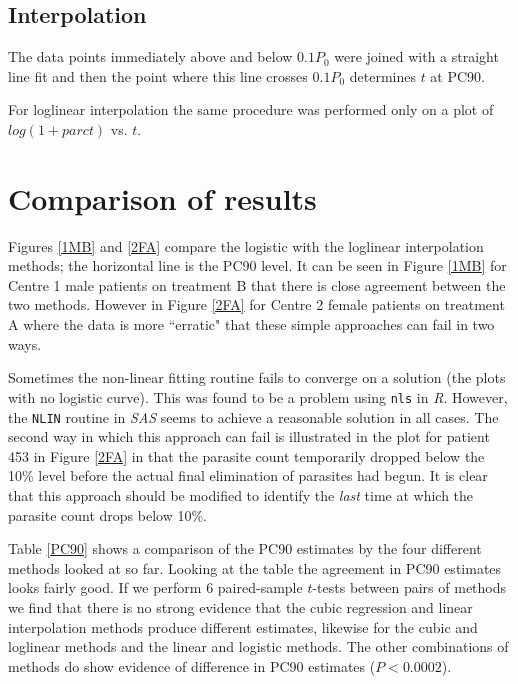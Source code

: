 \subsection{Interpolation}
The data points immediately above and below $0.1P_0$ were joined with a straight line fit and then the point where this line crosses $0.1P_0$ determines $t$ at PC90.

For loglinear interpolation the same procedure was performed only on a plot of $log(1+parct)$ vs. $t$.
\section{Comparison of results}
Figures \ref{1MB} and \ref{2FA} compare the logistic with the loglinear interpolation methods; the horizontal line is the PC90 level. It can be seen in Figure \ref{1MB} for Centre 1 male patients on treatment B that there is close agreement between the two methods. However in Figure \ref{2FA} for Centre 2 female patients on treatment A where the data is more ``erratic" that these simple approaches can fail in two ways.

Sometimes the non-linear fitting routine fails to converge on a solution (the plots with no logistic curve). This was found to be a problem using \texttt{nls} in \emph{R}. However, the \texttt{NLIN} routine in \emph{SAS} seems to achieve a reasonable solution in all cases. The second way in which this approach can fail is illustrated in the plot for patient 453 in Figure \ref{2FA} in that the parasite count temporarily dropped below the 10\% level before the actual final elimination of parasites had begun. It is clear that this approach should be modified to identify the \emph{last} time at which the parasite count drops below 10\%.

Table \ref{PC90} shows a comparison of the PC90 estimates by the four different methods looked at so far. Looking at the table the agreement in PC90 estimates looks fairly good. If we perform 6 paired-sample $t$-tests between pairs of methods we find that there is no strong evidence that the cubic regression and linear interpolation methods produce different estimates, likewise for the cubic and loglinear methods and the linear and logistic methods. The other combinations of methods do show evidence of difference in PC90 estimates ($P<0.0002$).

